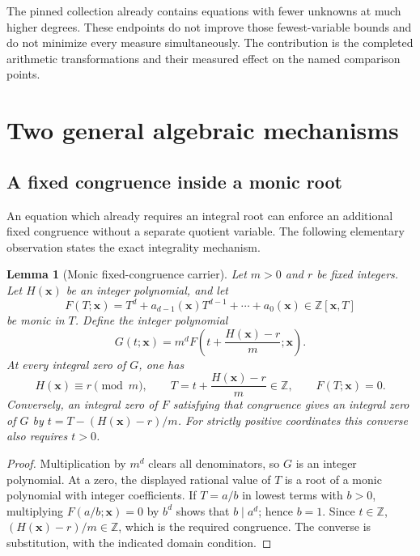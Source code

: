 \documentclass[11pt,a4paper]{article}
\newtheorem{lemma}[theorem]{Lemma}
\theoremstyle{definition}
\newcommand{\Z}{\mathbb Z}
\begin{document}
The pinned collection already contains equations with fewer unknowns at
much higher degrees.  These endpoints do not improve those
fewest-variable bounds and do not minimize every measure simultaneously.
The contribution is the completed arithmetic transformations and their
measured effect on the named comparison points.

\section{Two general algebraic mechanisms}
\label{sec:mechanisms}

\subsection{A fixed congruence inside a monic root}

An equation which already requires an integral root can enforce an
additional fixed congruence without a separate quotient variable.  The
following elementary observation states the exact integrality mechanism.

\begin{lemma}[Monic fixed-congruence carrier]
\label{lem:monic-carrier}
Let \(m>0\) and \(r\) be fixed integers.  Let \(H(\mathbf x)\) be an
integer polynomial, and let
\[
 F(T;\mathbf x)=T^d+
     a_{d-1}(\mathbf x)T^{d-1}+\cdots+a_0(\mathbf x)
 \in\Z[\mathbf x,T]
\]
be monic in \(T\).  Define the integer polynomial
\[
 G(t;\mathbf x)
  =m^dF\!\left(t+\frac{H(\mathbf x)-r}{m};\mathbf x\right).
\]
At every integral zero of \(G\), one has
\[
 H(\mathbf x)\equiv r\pmod m,
 \qquad
 T=t+\frac{H(\mathbf x)-r}{m}\in\Z,
 \qquad F(T;\mathbf x)=0.
\]
Conversely, an integral zero of \(F\) satisfying that congruence gives
an integral zero of \(G\) by
\(t=T-(H(\mathbf x)-r)/m\).
For strictly positive coordinates this converse also requires \(t>0\).
\end{lemma}

\begin{proof}
Multiplication by \(m^d\) clears all denominators, so \(G\) is an integer
polynomial.  At a zero, the displayed rational value of \(T\) is a root
of a monic polynomial with integer coefficients.  If \(T=a/b\) in
lowest terms with \(b>0\), multiplying \(F(a/b;\mathbf x)=0\) by \(b^d\)
shows that \(b\mid a^d\); hence \(b=1\).  Since \(t\in\Z\),
\((H(\mathbf x)-r)/m\in\Z\), which is the required congruence.
The converse is substitution, with the indicated domain condition.
\end{proof}
\end{document}
